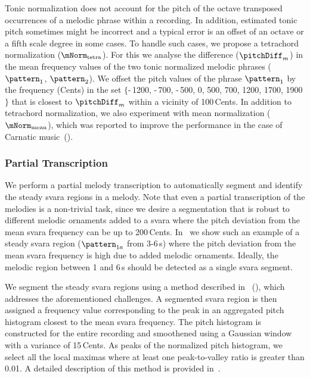 Tonic normalization does not account for the pitch of the octave transposed occurrences of a melodic phrase within a recording. In addition, estimated tonic pitch sometimes might be incorrect and a typical error is an offset of an octave or a fifth scale degree in some cases. To handle such cases, we propose a tetrachord normalization ($\mNorm_\mathrm{tetra}$). For this we analyse the difference ($\pitchDiff_m$) in the mean frequency values of the two tonic normalized melodic phrases ($\pattern_1$, $\pattern_2$). We offset the pitch values of the phrase $\pattern_1$ by the frequency (Cents) in the set $\lbrace$-\,1200, -\,700, -\,500, 0, 500, 700, 1200, 1700, 1900$\rbrace$ that is closest to $\pitchDiff_m$ within a vicinity of 100\,Cents. In addition to tetrachord normalization, we also experiment with mean normalization ($\mNorm_\mathrm{mean}$), which was reported to improve the performance in the case of Carnatic music~(). 


\subsubsection{Partial Transcription}
\label{sec:patterns_improving_similarity_partial_transcription}

We perform a partial melody transcription to automatically segment and identify the steady \gls{svara} regions in a melody. Note that even a partial transcription of the melodies is a non-trivial task, since we desire a segmentation that is robust to different melodic ornaments added to a \gls{svara} where the pitch deviation from the mean \gls{svara} frequency can be up to 200\,Cents. In~ we show such an example of a steady \gls{svara} region ($\pattern_{1a}$ from 3-6\,s) where the pitch deviation from the mean \gls{svara} frequency is high due to added melodic ornaments. Ideally, the melodic region between 1 and 6\,s should be detected as a single \gls{svara} segment.

We segment the steady \gls{svara} regions using a method described in~\cite{gulati2014Landmark} (), which addresses the aforementioned challenges. A segmented \gls{svara} region is then assigned a frequency value corresponding to the peak in an aggregated pitch histogram closest to the mean \gls{svara} frequency. The pitch histogram is constructed for the entire recording and smoothened using a Gaussian window with a variance of 15\,Cents. As peaks of the normalized pitch histogram, we select all the local maximas where at least one peak-to-valley ratio is greater than 0.01. A detailed description of this method is provided in~.
 
